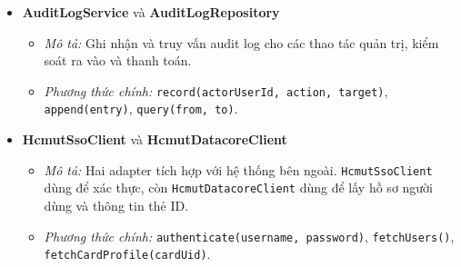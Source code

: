 \begin{itemize}[leftmargin=1.5cm]
    \item \textbf{AuditLogService} và \textbf{AuditLogRepository}
    \begin{itemize}
        \item \textit{Mô tả:} Ghi nhận và truy vấn audit log cho các thao tác quản trị, kiểm soát ra vào và thanh toán.
        \item \textit{Phương thức chính:} \texttt{record(actorUserId, action, target)}, \texttt{append(entry)}, \texttt{query(from, to)}.
    \end{itemize}

    \item \textbf{HcmutSsoClient} và \textbf{HcmutDatacoreClient}
    \begin{itemize}
        \item \textit{Mô tả:} Hai adapter tích hợp với hệ thống bên ngoài. \texttt{HcmutSsoClient} dùng để xác thực, còn \texttt{HcmutDatacoreClient} dùng để lấy hồ sơ người dùng và thông tin thẻ ID.
        \item \textit{Phương thức chính:} \texttt{authenticate(username, password)}, \texttt{fetchUsers()}, \texttt{fetchCardProfile(cardUid)}.
    \end{itemize}
\end{itemize}

